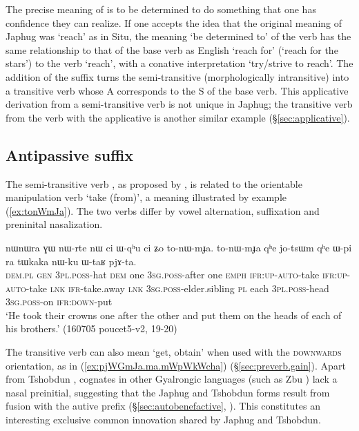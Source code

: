 The precise meaning of   is to be determined to do something that one has confidence they can realize. If one accepts the idea that the original meaning of Japhug  was `reach' as in Situ, the meaning `be determined to' of the verb  has the same relationship to that of the base verb as English `reach for' (`reach for the stars') to the verb `reach', with a conative interpretation `try/strive to reach'.  The addition of the suffix  turns the semi-transitive (morphologically intransitive)  into a transitive verb whose A corresponds to the S of the base verb. This applicative derivation from a semi-transitive verb is not unique in Japhug; the transitive verb  from the verb  with the  applicative is another similar example (§\ref{sec:applicative}).

\subsection{Antipassive  suffix} \label{sec:antipassive.t}
The semi-transitive verb , 
as proposed by \citet[310]{gong18these}, is related to the orientable manipulation verb   `take (from)', a meaning illustrated by example (\ref{ex:tonWmJa}). The two verbs differ by vowel alternation,  suffixation and preninital nasalization.
 
\begin{exe}
\ex \label{ex:tonWmJa}
\gll  nɯnɯra ɣɯ nɯ-rte nɯ ci ɯ-qʰu ci ʑo to-nɯ-mɟa. to-nɯ-mɟa qʰe jo-tsɯm qʰe ɯ-pi ra tɯkaka nɯ-ku ɯ-taʁ pjɤ-ta. \\
\textsc{dem}.\textsc{pl} \textsc{gen} \textsc{3pl}.\textsc{poss}-hat \textsc{dem} one \textsc{3sg}.\textsc{poss}-after one \textsc{emph} \textsc{ifr}:\textsc{up}-\textsc{auto}-take  \textsc{ifr}:\textsc{up}-\textsc{auto}-take \textsc{lnk} \textsc{ifr}-take.away \textsc{lnk} \textsc{3sg}.\textsc{poss}-elder.sibling \textsc{pl} each \textsc{3pl}.\textsc{poss}-head \textsc{3sg}.\textsc{poss}-on \textsc{ifr}:\textsc{down}-put \\
\glt `He took their crowns one after the other and put them on the heads of each of his brothers.' (160705 poucet5-v2, 19-20) 
\end{exe}

The transitive verb  can also mean `get, obtain' when used with the \textsc{downwards} orientation, as in (\ref{ex:pjWGmJa.ma.mWpWkWcha}) (§\ref{sec:preverb.gain}). Apart from Tshobdun , cognates in other Gyalrongic languages (such as Zbu ) lack a nasal preinitial, suggesting that the Japhug and Tshobdun forms result from fusion with the autive prefix (§\ref{sec:autobenefactive}, \citealt[310]{gong18these}). This constitutes an interesting exclusive common innovation shared by Japhug and Tshobdun. 

